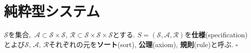 \section{純粋型システム}
\begin{definition}
$\mathcal{S}$を集合,\ $\mathcal{A} \subset \mathcal{S} \times \mathcal{S}$, $\mathcal{R} \subset \mathcal{S} \times \mathcal{S} \times \mathcal{S}$とする.
$S = (\mathcal{S}, \mathcal{A}, \mathcal{R})$を\textbf{仕様}(specification)とよび$\mathcal{S}$, $\mathcal{A}$, $\mathcal{R}$それぞれの元を\textbf{ソート}(sort), \textbf{公理}(axiom), \textbf{規則}(rule)と呼ぶ.
\hfill $\square$
\end{definition}

